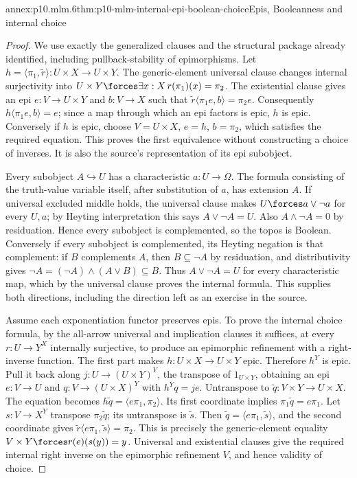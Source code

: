 \begin{annexitem}{annex:p10.mlm.6}{thm:p10-mlm-internal-epi-boolean-choice}{Epis, Booleanness and internal choice}
\begin{proof}
We use exactly the generalized clauses and the structural package already
identified, including pullback-stability of epimorphisms.
Let \(h=\langle\pi_1,\widetilde r\rangle:U\times X\to U\times Y\).
The generic-element universal clause changes internal surjectivity into
\(U\times Y\forces\exists x:X\,r(\pi_1)(x)=\pi_2\).
The existential clause gives an epi \(e:V\to U\times Y\) and \(b:V\to X\)
such that \(\widetilde r\langle\pi_1e,b\rangle=\pi_2e\).
Consequently \(h\langle\pi_1e,b\rangle=e\); since a map through which an
epi factors is epic, \(h\) is epic. Conversely if \(h\) is epic, choose
\(V=U\times X\), \(e=h\), \(b=\pi_2\), which satisfies the required
equation. This proves the first equivalence without constructing a choice
of inverses. It is also the source's representation of its epi subobject.

Every subobject \(A\hookrightarrow U\) has a characteristic
\(a:U\to\Omega\). The formula consisting of the truth-value variable
itself, after substitution of \(a\), has extension \(A\).
If universal excluded middle holds, the universal clause makes
\(U\forces a\vee\neg a\) for every \(U,a\); by Heyting interpretation this
says \(A\vee\neg A=U\). Also \(A\wedge\neg A=0\) by residuation. Hence
every subobject is complemented, so the topos is Boolean. Conversely if
every subobject is complemented, its Heyting negation is that complement:
if \(B\) complements \(A\), then \(B\subseteq\neg A\) by residuation,
and distributivity gives \(\neg A=(\neg A)\wedge(A\vee B)\subseteq B\).
Thus \(A\vee\neg A=U\) for every characteristic map, which by the universal
clause proves the internal formula. This supplies both directions, including
the direction left as an exercise in the source.

Assume each exponentiation functor preserves epis. To prove the internal
choice formula, by the all-arrow universal and implication clauses it
suffices, at every \(r:U\to Y^X\) internally surjective, to produce an
epimorphic refinement with a right-inverse function. The first part makes
\(h:U\times X\to U\times Y\) epic. Therefore \(h^Y\) is epic. Pull it back
along \(j:U\to(U\times Y)^Y\), the transpose of \(1_{U\times Y}\), obtaining
an epi \(e:V\to U\) and \(q:V\to(U\times X)^Y\) with \(h^Yq=je\).
Untranspose to \(\widetilde q:V\times Y\to U\times X\).
The equation becomes
\(h\widetilde q=\langle e\pi_1,\pi_2\rangle\).
Its first coordinate implies \(\pi_1\widetilde q=e\pi_1\).
Let \(s:V\to X^Y\) transpose \(\pi_2\widetilde q\); its untranspose is
\(\widetilde s\). Then \(\widetilde q=\langle e\pi_1,\widetilde s\rangle\),
and the second coordinate gives
\(\widetilde r\langle e\pi_1,\widetilde s\rangle=\pi_2\).
This is precisely the generic-element equality
\(V\times Y\forces r(e)(s(y))=y\).
Universal and existential clauses give the required internal right inverse
on the epimorphic refinement \(V\), and hence validity of choice.


\end{proof}
\end{annexitem}
